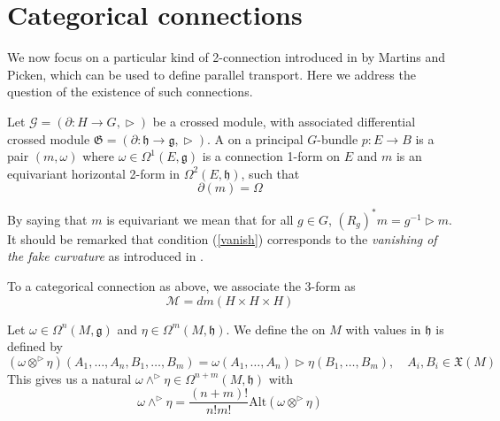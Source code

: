 \newpage
\section{Categorical connections} \label{catconn}
We now focus on a particular kind of 2-connection introduced in \cite{picken_faria} by Martins and Picken, which can be used to define parallel transport. Here we address the question of the existence of such connections.


\begin{definition}
 Let $\mathcal{G}=(\partial :H\rightarrow G,\vartriangleright)$ be a crossed module, with associated differential crossed module $\mathfrak{G}=(\partial:\mathfrak{h}\rightarrow \mathfrak{g},\vartriangleright)$. A  on a principal $G$-bundle $p:E \rightarrow B$ is a pair $(m,\omega)$ where $\omega\in \Omega^1(E,\mathfrak{g})$ is a connection 1-form on $E$ and $m$ is an equivariant horizontal 2-form in $\Omega^2(E,\mathfrak{h})$, such that
\begin{equation}
\partial (m)=\Omega \label{vanish}
\end{equation}
\end{definition}
By saying that $m$ is equivariant we mean that for all $g\in G$, $(R_g)^*m=g^{-1} \vartriangleright m$. It should be remarked that condition (\ref{vanish}) corresponds to the \emph{vanishing of the fake curvature} as introduced in \cite{breen-2001}.

\begin{definition}
 To a categorical connection as above, we associate the  3-form as
\[
 \mathcal{M}=dm(H\times H\times H)
\]
\end{definition}


\begin{definition}\label{rw}
 Let $\omega \in \Omega^n(M,\mathfrak{g})$ and $\eta\in \Omega^m(M,\mathfrak{h})$. We define the  on $M$ with values in $\mathfrak{h}$ is defined by
\[
 (\omega\otimes^\vartriangleright \eta)(A_1,\ldots,A_n,B_1,\ldots,B_m)=\omega(A_1,\ldots,A_n)\vartriangleright \eta(B_1,\ldots,B_m), \quad A_i,B_i\in \mathfrak{X}(M)
\]
This gives us a natural  $\omega\wedge^\vartriangleright \eta \in \Omega^{n+m}(M,\mathfrak{h})$ with
\[
 \omega\wedge^\vartriangleright \eta=\frac{(n+m)!}{n!m!}\text{Alt}(\omega\otimes^\vartriangleright\eta)
\]
\end{definition}

